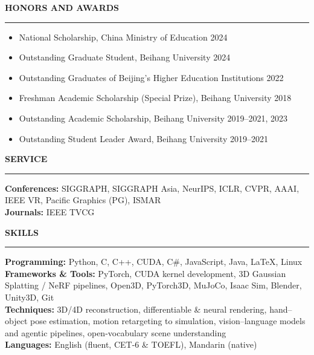 \documentclass[10pt,a4paper]{article}
\newcommand{\cvsection}[1]{%
  \vspace{0.7em}%
  {\rmfamily\large\bfseries\MakeUppercase{#1}}\\[-0.3em]%
  \rule{\linewidth}{0.5pt}\par\vspace{0.3em}%
}
\begin{document}
\cvsection{Honors and Awards}
\begin{itemize}
  \item National Scholarship, China Ministry of Education \hfill 2024
  \item Outstanding Graduate Student, Beihang University \hfill 2024
  \item Outstanding Graduates of Beijing's Higher Education Institutions \hfill 2022
  \item Freshman Academic Scholarship (Special Prize), Beihang University \hfill 2018
  \item Outstanding Academic Scholarship, Beihang University \hfill 2019--2021, 2023
  \item Outstanding Student Leader Award, Beihang University \hfill 2019--2021
\end{itemize}

\cvsection{Service}
\textbf{Conferences:} SIGGRAPH, SIGGRAPH Asia, NeurIPS, ICLR, CVPR, AAAI, IEEE VR, Pacific Graphics (PG), ISMAR\\
\textbf{Journals:} IEEE TVCG

\cvsection{Skills}
\textbf{Programming:} Python, C, C++, CUDA, C\#, JavaScript, Java, LaTeX, Linux\\
\textbf{Frameworks \& Tools:} PyTorch, CUDA kernel development, 3D Gaussian Splatting / NeRF pipelines,
Open3D, PyTorch3D, MuJoCo, Isaac Sim, Blender, Unity3D, Git\\
\textbf{Techniques:} 3D/4D reconstruction, differentiable \& neural rendering, hand--object pose estimation,
motion retargeting to simulation, vision--language models and agentic pipelines, open-vocabulary scene understanding\\
\textbf{Languages:} English (fluent, CET-6 \& TOEFL), Mandarin (native)
\end{document}
